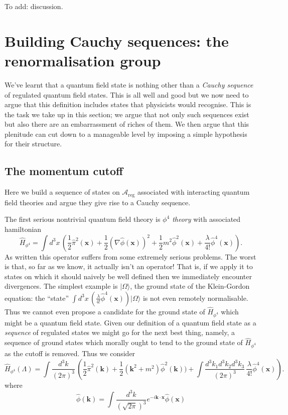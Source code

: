 \documentclass[11pt]{amsart}
\theoremstyle{plain}%
\theoremstyle{definition}
\theoremstyle{remark}
\begin{document}
To add: discussion.


\section{Building Cauchy sequences: the renormalisation group}\label{sec:cauchyseqrg}

We've learnt that a quantum field state is nothing other than a \emph{Cauchy sequence} of regulated quantum field states. This is all well and good but we now need to argue that this definition includes states that physicists would recognise. This is the task we take up in this section; we argue that not only such sequences exist but also there are an embarrassment of riches of them. We then argue that this plenitude can cut down to a manageable level by imposing a simple hypothesis for their structure.

\subsection{The momentum cutoff}
Here we build a sequence of states on $\mathcal{A}_{\text{reg}}$ associated with interacting quantum field theories and argue they give rise to a Cauchy sequence. 

The first serious nontrivial quantum field theory is \emph{$\phi^4$ theory} with associated hamiltonian
\begin{equation}
	\widehat{H}_{\phi^4} = \int d^3 {x}\, \left(\frac12\widehat{\pi}^2(\mathbf{x}) + \frac12(\nabla \widehat{\phi}(\mathbf{x}))^2 + \frac12m^2 \widehat{\phi}^2(\mathbf{x}) + \frac{\lambda}{4!}\widehat{\phi}^4(\mathbf{x})\right).
\end{equation}
As written this operator suffers from some extremely serious problems. The worst is that, so far as we know, it actually isn't an operator! That is, if we apply it to states on which it should naively be well defined then we immediately encounter divergences. The simplest example is $|\Omega\rangle$, the ground state of the Klein-Gordon equation: the ``state'' $\int d^3 {x}\, \left(\frac{\lambda}{4!}\widehat{\phi}^4(\mathbf{x})\right) |\Omega\rangle$ is not even remotely normalisable. Thus we cannot even propose a candidate for the ground state of $\widehat{H}_{\phi^4}$ which might be a quantum field state. Given our definition of a quantum field state as a \emph{sequence} of regulated states we might go for the next best thing, namely, a sequence of ground states which morally ought to tend to the ground state of $\widehat{H}_{\phi^4}$ as the cutoff is removed. Thus we consider 
\begin{equation}
	\widehat{H}_{\phi^4}(\Lambda) = \int \frac{d^3 {k}}{(2\pi)^3}\, \left(\frac12\widehat{\pi}^2(\mathbf{k}) + \frac12(\mathbf{k}^2 + m^2)\widehat{\phi}^2(\mathbf{k}))  + \int \frac{d^3 {k}_1d^3 {k}_2d^3 {k}_3}{(2\pi)^3}\, \frac{\lambda}{4!}\widehat{\phi}^4(\mathbf{x})\right).
\end{equation}
where
\begin{equation}
	\widehat{\phi}(\mathbf{k}) = \int \frac{d^3 {k}}{(\sqrt{2\pi})^{3}} e^{-i\mathbf{k}\cdot \mathbf{x}} \widehat{\phi}(\mathbf{x})
\end{equation}
\end{document}
